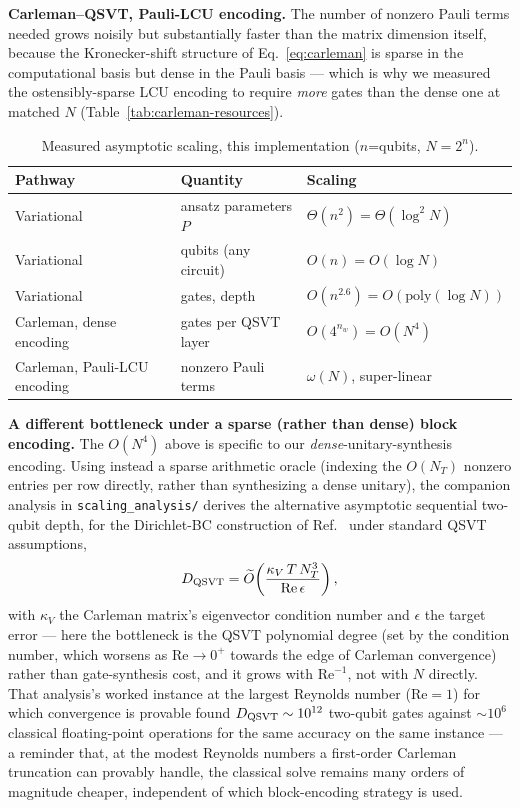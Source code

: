 \documentclass[aps,pra,twocolumn,notitlepage,superscriptaddress,floatfix,10pt]{revtex4-2}
\begin{document}
\textbf{Carleman--QSVT, Pauli-LCU encoding.} The number of nonzero Pauli terms needed grows noisily
but substantially faster than the matrix dimension itself, because the Kronecker-shift structure of
Eq.~\eqref{eq:carleman} is sparse in the computational basis but dense in the Pauli basis --- which
is why we measured the ostensibly-sparse LCU encoding to require \emph{more} gates than the dense one
at matched $N$ (Table~\ref{tab:carleman-resources}).

\begin{table}[t]
\caption{Measured asymptotic scaling, this implementation ($n$=qubits, $N=2^n$).}
\label{tab:bigo}
\begin{ruledtabular}
\begin{tabular}{lll}
Pathway & Quantity & Scaling \\
\hline
Variational & ansatz parameters $P$ & $\Theta(n^2)=\Theta(\log^2N)$ \\
Variational & qubits (any circuit) & $O(n)=O(\log N)$ \\
Variational & gates, depth & $O(n^{2.6})=O(\mathrm{poly}(\log N))$ \\
Carleman, dense encoding & gates per QSVT layer & $O(4^{n_w})=O(N^4)$ \\
Carleman, Pauli-LCU encoding & nonzero Pauli terms & $\omega(N)$, super-linear \\
\end{tabular}
\end{ruledtabular}
\end{table}

\textbf{A different bottleneck under a sparse (rather than dense) block encoding.} The $O(N^4)$ above
is specific to our \emph{dense}-unitary-synthesis encoding. Using instead a sparse arithmetic oracle
(indexing the $O(N_T)$ nonzero entries per row directly, rather than synthesizing a dense unitary),
the companion analysis in \texttt{scaling\_analysis/} derives the alternative asymptotic sequential
two-qubit depth, for the Dirichlet-BC construction of Ref.~\cite{Setty2026} under standard QSVT
assumptions,
\begin{equation}
D_{\rm QSVT}=\widetilde{O}\!\left(\frac{\kappa_V\,T\,N_T^{3}}{\mathrm{Re}\,\epsilon}\right),
\label{eq:sparse-depth}
\end{equation}
with $\kappa_V$ the Carleman matrix's eigenvector condition number and $\epsilon$ the target error ---
here the bottleneck is the QSVT polynomial degree (set by the condition number, which worsens as
$\mathrm{Re}\to0^+$ towards the edge of Carleman convergence) rather than gate-synthesis cost, and it
grows with $\mathrm{Re}^{-1}$, not with $N$ directly. That analysis's worked instance at the largest
Reynolds number ($\mathrm{Re}=1$) for which convergence is provable found $D_{\rm QSVT}\sim10^{12}$
two-qubit gates against $\sim10^6$ classical floating-point operations for the same accuracy on the
same instance --- a reminder that, at the modest Reynolds numbers a first-order Carleman truncation
can provably handle, the classical solve remains many orders of magnitude cheaper, independent of
which block-encoding strategy is used.
\end{document}
